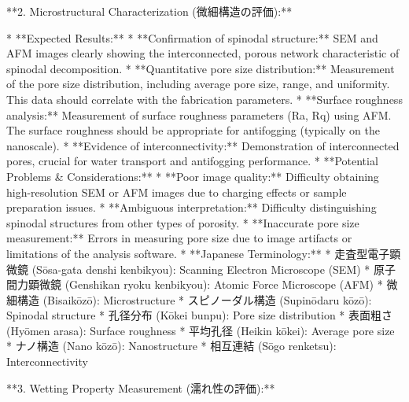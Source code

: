 \documentclass{article}
\begin{document}
**2. Microstructural Characterization (微細構造の評価):**

*   **Expected Results:**
    *   **Confirmation of spinodal structure:**  SEM and AFM images clearly showing the interconnected, porous network characteristic of spinodal decomposition.
    *   **Quantitative pore size distribution:**  Measurement of the pore size distribution, including average pore size, range, and uniformity.  This data should correlate with the fabrication parameters.
    *   **Surface roughness analysis:** Measurement of surface roughness parameters (Ra, Rq) using AFM.  The surface roughness should be appropriate for antifogging (typically on the nanoscale).
    *   **Evidence of interconnectivity:** Demonstration of interconnected pores, crucial for water transport and antifogging performance.
*   **Potential Problems & Considerations:**
    *   **Poor image quality:**  Difficulty obtaining high-resolution SEM or AFM images due to charging effects or sample preparation issues.
    *   **Ambiguous interpretation:**  Difficulty distinguishing spinodal structures from other types of porosity.
    *   **Inaccurate pore size measurement:** Errors in measuring pore size due to image artifacts or limitations of the analysis software.
*   **Japanese Terminology:**
    *   走査型電子顕微鏡 (Sōsa-gata denshi kenbikyou): Scanning Electron Microscope (SEM)
    *   原子間力顕微鏡 (Genshikan ryoku kenbikyou): Atomic Force Microscope (AFM)
    *   微細構造 (Bisaikōzō): Microstructure
    *   スピノーダル構造 (Supinōdaru kōzō): Spinodal structure
    *   孔径分布 (Kōkei bunpu): Pore size distribution
    *   表面粗さ (Hyōmen arasa): Surface roughness
    *   平均孔径 (Heikin kōkei): Average pore size
    *   ナノ構造 (Nano kōzō): Nanostructure
    *   相互連結 (Sōgo renketsu): Interconnectivity

**3. Wetting Property Measurement (濡れ性の評価):**
\end{document}
